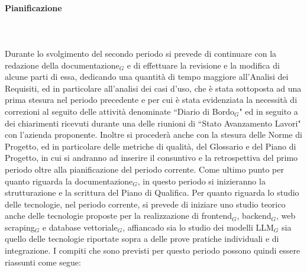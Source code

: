 \paragraph{Pianificazione} \hspace{1cm}
\\ \hspace{1cm} \\
Durante lo svolgimento del secondo periodo si prevede di continuare con la redazione della documentazione$_G$ e di effettuare la revisione e la modifica di alcune parti di essa, dedicando una quantità di tempo maggiore all'Analisi dei Requisiti, ed in particolare all'analisi dei casi d'uso, che è stata sottoposta ad una prima stesura nel periodo precedente e per cui è stata evidenziata la necessità di correzioni al seguito delle attività denominate ``Diario di Bordo$_G$" ed in seguito a dei chiarimenti ricevuti durante una delle riunioni di ``Stato Avanzamento Lavori" con l'azienda proponente.
Inoltre si procederà anche con la stesura delle Norme di Progetto, ed in particolare delle metriche di qualità, del Glossario e del Piano di Progetto, in cui si andranno ad inserire il consuntivo e la retrospettiva del primo periodo oltre alla pianificazione del periodo corrente.
Come ultimo punto per quanto riguarda la documentazione$_G$, in questo periodo si inizieranno la strutturazione e la scrittura del Piano di Qualifica.
Per quanto riguarda lo studio delle tecnologie, nel periodo corrente, si prevede di iniziare uno studio teorico anche delle tecnologie proposte per la realizzazione di frontend$_G$, backend$_G$, web scraping$_G$ e database vettoriale$_G$, affiancado sia lo studio dei modelli LLM$_G$ sia quello delle tecnologie riportate sopra a delle prove pratiche individuali e di integrazione.
I compiti che sono previsti per questo periodo possono quindi essere riassunti come segue:

